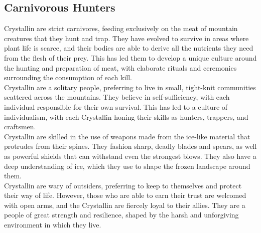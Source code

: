\subsection{Carnivorous Hunters}
Crystallin are strict carnivores, feeding exclusively on the meat of mountain creatures that they hunt and trap. They have evolved to survive in areas where plant life is scarce, and their bodies are able to derive all the nutrients they need from the flesh of their prey. This has led them to develop a unique culture around the hunting and preparation of meat, with elaborate rituals and ceremonies surrounding the consumption of each kill.\\
Crystallin are a solitary people, preferring to live in small, tight-knit communities scattered across the mountains. They believe in self-sufficiency, with each individual responsible for their own survival. This has led to a culture of individualism, with each Crystallin honing their skills as hunters, trappers, and craftsmen.\\
Crystallin are skilled in the use of weapons made from the ice-like material that protrudes from their spines. They fashion sharp, deadly blades and spears, as well as powerful shields that can withstand even the strongest blows. They also have a deep understanding of ice, which they use to shape the frozen landscape around them.\\
Crystallin are wary of outsiders, preferring to keep to themselves and protect their way of life. However, those who are able to earn their trust are welcomed with open arms, and the Crystallin are fiercely loyal to their allies. They are a people of great strength and resilience, shaped by the harsh and unforgiving environment in which they live.
